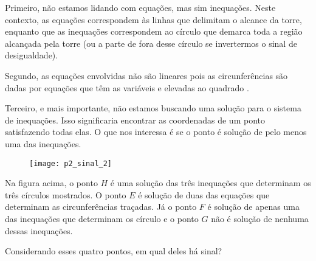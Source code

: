 Primeiro, não estamos lidando com equações, mas sim inequações. Neste contexto, as equações correspondem às linhas que delimitam o alcance da torre, enquanto que as inequações correspondem ao círculo que demarca toda a região alcançada pela torre (ou a parte de fora desse círculo se invertermos o sinal de desigualdade).

Segundo, as equações envolvidas não são lineares pois as circunferências são dadas por equações que têm as variáveis  e  elevadas ao quadrado .

Terceiro, e mais importante, não estamos buscando uma solução para o sistema de inequações. Isso significaria encontrar as coordenadas de um ponto satisfazendo todas elas. O que nos interessa é se o ponto é solução de pelo menos uma das inequações.

\begin{figure}[H]
\centering

\texttt{[image: p2\_sinal\_2]}
\end{figure}

Na figura acima, o ponto $H$ é uma solução das três inequações que determinam os três círculos mostrados. O ponto $E$ é solução de duas das equações que determinam as circunferências traçadas. Já o ponto $F$ é solução de apenas uma das inequações que determinam os círculo e o ponto $G$ não é solução de nenhuma dessas inequações.

Considerando esses quatro pontos, em qual deles há sinal?

